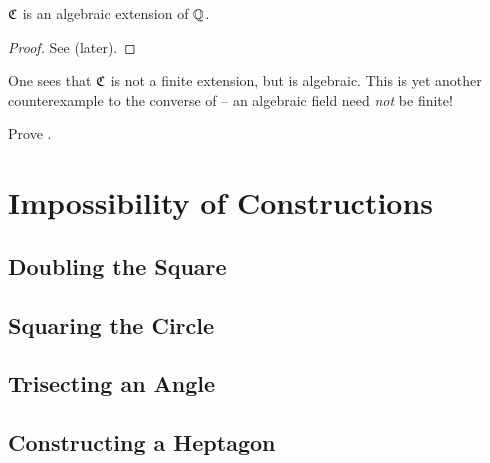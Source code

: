 \begin{corollary}\label{corollary-field-of-all-constructible-numbers-is-algebraic-extension}
    $\mathfrak{C}$ is an algebraic extension of $\mathbb{Q}$.
\end{corollary}
\begin{proof}
    See  (later).
\end{proof}

One sees that $\mathfrak{C}$ is not a finite extension, but is algebraic. This is yet another counterexample to the converse of  -- an algebraic field need \textit{not} be finite!

\begin{exercise}\label{exercise-field-of-all-constructible-numbers-is-algebraic-extension}
    Prove .
\end{exercise}

\section{Impossibility of Constructions}

\subsection{Doubling the Square}

\subsection{Squaring the Circle}

\subsection{Trisecting an Angle}

\subsection{Constructing a Heptagon}
